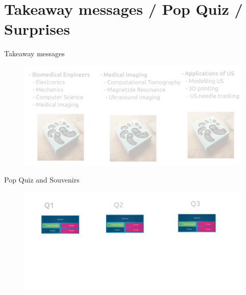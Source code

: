 \section{Takeaway messages / Pop Quiz / Surprises }



{
\begin{frame}{Takeaway messages}
  \begin{figure}
  \centering
  \includegraphics[width=1.0\textwidth]{./figures/takeaways/versions/drawing-v01}
  \end{figure}

\end{frame}
}

{
\begin{frame}{Pop Quiz and Souvenirs}
  \begin{figure}
  \centering
  \includegraphics[width=1.0\textwidth]{./figures/evaluation-souvenirs/versions/drawing-v00}
  \end{figure}

\end{frame}
}

